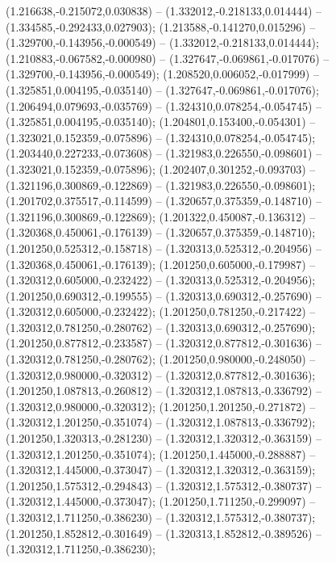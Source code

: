  (1.216638,-0.215072,0.030838) -- (1.332012,-0.218133,0.014444) -- (1.334585,-0.292433,0.027903);
 (1.213588,-0.141270,0.015296) -- (1.329700,-0.143956,-0.000549) -- (1.332012,-0.218133,0.014444);
 (1.210883,-0.067582,-0.000980) -- (1.327647,-0.069861,-0.017076) -- (1.329700,-0.143956,-0.000549);
 (1.208520,0.006052,-0.017999) -- (1.325851,0.004195,-0.035140) -- (1.327647,-0.069861,-0.017076);
 (1.206494,0.079693,-0.035769) -- (1.324310,0.078254,-0.054745) -- (1.325851,0.004195,-0.035140);
 (1.204801,0.153400,-0.054301) -- (1.323021,0.152359,-0.075896) -- (1.324310,0.078254,-0.054745);
 (1.203440,0.227233,-0.073608) -- (1.321983,0.226550,-0.098601) -- (1.323021,0.152359,-0.075896);
 (1.202407,0.301252,-0.093703) -- (1.321196,0.300869,-0.122869) -- (1.321983,0.226550,-0.098601);
 (1.201702,0.375517,-0.114599) -- (1.320657,0.375359,-0.148710) -- (1.321196,0.300869,-0.122869);
 (1.201322,0.450087,-0.136312) -- (1.320368,0.450061,-0.176139) -- (1.320657,0.375359,-0.148710);
 (1.201250,0.525312,-0.158718) -- (1.320313,0.525312,-0.204956) -- (1.320368,0.450061,-0.176139);
 (1.201250,0.605000,-0.179987) -- (1.320312,0.605000,-0.232422) -- (1.320313,0.525312,-0.204956);
 (1.201250,0.690312,-0.199555) -- (1.320313,0.690312,-0.257690) -- (1.320312,0.605000,-0.232422);
 (1.201250,0.781250,-0.217422) -- (1.320312,0.781250,-0.280762) -- (1.320313,0.690312,-0.257690);
 (1.201250,0.877812,-0.233587) -- (1.320312,0.877812,-0.301636) -- (1.320312,0.781250,-0.280762);
 (1.201250,0.980000,-0.248050) -- (1.320312,0.980000,-0.320312) -- (1.320312,0.877812,-0.301636);
 (1.201250,1.087813,-0.260812) -- (1.320312,1.087813,-0.336792) -- (1.320312,0.980000,-0.320312);
 (1.201250,1.201250,-0.271872) -- (1.320312,1.201250,-0.351074) -- (1.320312,1.087813,-0.336792);
 (1.201250,1.320313,-0.281230) -- (1.320312,1.320312,-0.363159) -- (1.320312,1.201250,-0.351074);
 (1.201250,1.445000,-0.288887) -- (1.320312,1.445000,-0.373047) -- (1.320312,1.320312,-0.363159);
 (1.201250,1.575312,-0.294843) -- (1.320312,1.575312,-0.380737) -- (1.320312,1.445000,-0.373047);
 (1.201250,1.711250,-0.299097) -- (1.320312,1.711250,-0.386230) -- (1.320312,1.575312,-0.380737);
 (1.201250,1.852812,-0.301649) -- (1.320313,1.852812,-0.389526) -- (1.320312,1.711250,-0.386230);
